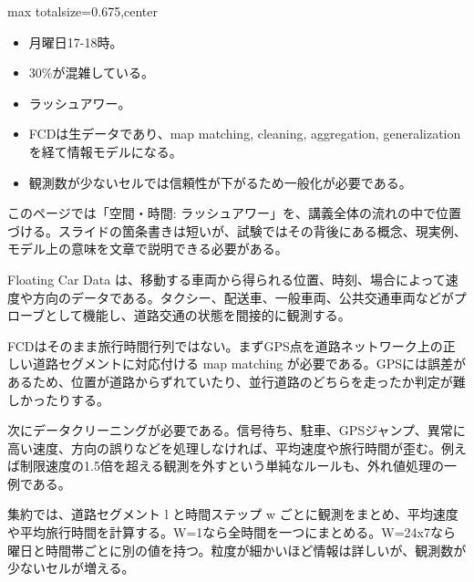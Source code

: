 \clearpage
{}
\begin{adjustbox}{max totalsize={\textwidth}{0.675\textheight},center}
\begin{minipage}{\textwidth}\scriptsize
\begin{minipage}[t]{0.485\textwidth}
\begin{itemize}
\item 月曜日17-18時。
\item 30\%が混雑している。
\item ラッシュアワー。
\end{itemize}
\begin{itemize}
\item FCDは生データであり、map matching, cleaning, aggregation, generalization を経て情報モデルになる。
\item 観測数が少ないセルでは信頼性が下がるため一般化が必要である。
\end{itemize}
\end{minipage}\hfill
\begin{minipage}[t]{0.485\textwidth}
このページでは「空間・時間: ラッシュアワー」を、講義全体の流れの中で位置づける。スライドの箇条書きは短いが、試験ではその背後にある概念、現実例、モデル上の意味を文章で説明できる必要がある。\par
Floating Car Data は、移動する車両から得られる位置、時刻、場合によって速度や方向のデータである。タクシー、配送車、一般車両、公共交通車両などがプローブとして機能し、道路交通の状態を間接的に観測する。\par
FCDはそのまま旅行時間行列ではない。まずGPS点を道路ネットワーク上の正しい道路セグメントに対応付ける map matching が必要である。GPSには誤差があるため、位置が道路からずれていたり、並行道路のどちらを走ったか判定が難しかったりする。\par
次にデータクリーニングが必要である。信号待ち、駐車、GPSジャンプ、異常に高い速度、方向の誤りなどを処理しなければ、平均速度や旅行時間が歪む。例えば制限速度の1.5倍を超える観測を外すという単純なルールも、外れ値処理の一例である。\par
集約では、道路セグメント l と時間ステップ w ごとに観測をまとめ、平均速度や平均旅行時間を計算する。W=1なら全時間を一つにまとめる。W=24x7なら曜日と時間帯ごとに別の値を持つ。粒度が細かいほど情報は詳しいが、観測数が少ないセルが増える。\par

\end{minipage}
\end{minipage}
\end{adjustbox}
